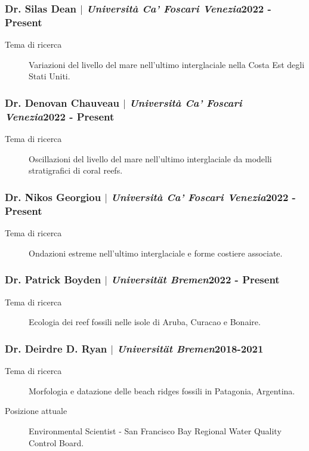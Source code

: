 \documentclass[11pt]{article}
\begin{document}
\subsubsection{Dr. Silas Dean $|$ {\normalfont\textit{Università Ca' Foscari Venezia}}\hfill 2022 - Present}
{\footnotesize 
\begin{description}
  \item [Tema di ricerca] Variazioni del livello del mare nell'ultimo interglaciale nella Costa Est degli Stati Uniti. 
\end{description}
}
\smallskip
\subsubsection{Dr. Denovan Chauveau $|$ {\normalfont\textit{Università Ca' Foscari Venezia}}\hfill 2022 - Present}
{\footnotesize 
\begin{description}
  \item [Tema di ricerca] Oscillazioni del livello del mare nell'ultimo interglaciale da modelli stratigrafici di coral reefs. 
\end{description}
}

\smallskip
\subsubsection{Dr. Nikos Georgiou $|$ {\normalfont\textit{Università Ca' Foscari Venezia}}\hfill 2022 - Present}
{\footnotesize 
\begin{description}
  \item [Tema di ricerca] Ondazioni estreme nell'ultimo interglaciale e forme costiere associate. 
\end{description}
}
\smallskip
\subsubsection{Dr. Patrick Boyden $|$ {\normalfont\textit{Universität Bremen}}\hfill 2022 - Present}
{\footnotesize 
\begin{description}
  \item [Tema di ricerca] Ecologia dei reef fossili nelle isole di Aruba, Curacao e Bonaire. 
\end{description}
}

\smallskip
\subsubsection{Dr. Deirdre D. Ryan $|$ {\normalfont\textit{Universität Bremen}}\hfill 2018-2021}
{\footnotesize 
\begin{description}
  \item [Tema di ricerca] Morfologia e datazione delle beach ridges fossili in Patagonia, Argentina. 
  \item [Posizione attuale] Environmental Scientist - San Francisco Bay Regional Water Quality Control Board. 
\end{description}
}
\end{document}

